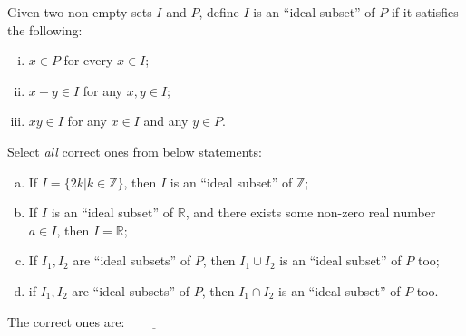 \documentclass[b5paper]{article}
\begin{document}
\begin{mdframed}
Given two non-empty sets $I$ and $P$, define $I$ is an \enquote{ideal subset} of $P$ if it satisfies the following:

\begin{enumerate}[(i)]
\item $x \in P$ for every $x \in I$;
\item $x + y \in I$ for any $x, y \in I$;
\item $xy \in I$ for any $x \in I$ and any $y \in P$.
\end{enumerate}

Select \emph{all} correct ones from below statements:

\begin{enumerate}[(a)]
\item If $I = \{2k | k \in \mathbb{Z} \}$, then $I$ is an \enquote{ideal subset} of $\mathbb{Z}$;
\item If $I$ is an \enquote{ideal subset} of $\mathbb{R}$, and there exists some non-zero real number $a \in I$, then $I = \mathbb{R}$;
\item If $I_1, I_2$ are \enquote{ideal subsets} of $P$, then $I_1 \cup I_2$ is an \enquote{ideal subset} of $P$ too;
\item if $I_1, I_2$ are \enquote{ideal subsets} of $P$, then $I_1 \cap I_2$ is an \enquote{ideal subset} of $P$ too.
\end{enumerate}

The correct ones are: $\underline{\qquad \qquad}$

\end{mdframed}
\end{document}
